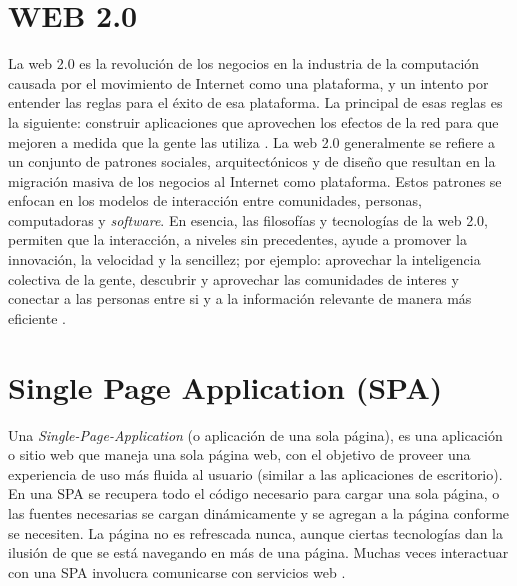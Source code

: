 \section{WEB 2.0} \label{sect:WEB 2.0}

La web 2.0 es la revolución de los negocios en la industria de la computación causada por el movimiento de Internet como una plataforma, y un intento por entender las reglas para el éxito de esa plataforma. La principal de esas reglas es la siguiente: construir aplicaciones que aprovechen los efectos de la red para que mejoren a medida que la gente las utiliza \cite{MTSAAS}.
La web 2.0 generalmente se refiere a un conjunto de patrones sociales, arquitectónicos y de diseño que resultan en la migración masiva de los negocios al Internet como plataforma. Estos patrones se enfocan en los modelos de interacción entre comunidades, personas, computadoras y \textit{software}. En esencia, las filosofías y tecnologías de la web 2.0, permiten que la interacción, a niveles sin precedentes, ayude a promover la innovación, la velocidad y la sencillez; por ejemplo: aprovechar la inteligencia colectiva de la gente, descubrir y aprovechar las comunidades de interes y conectar a las personas entre si y a la información relevante de manera más eficiente \cite{MTSAAS}.

\section{Single Page Application (SPA)} \label{sect:Single Page Application} 

Una \textit{Single-Page-Application} (o aplicación de una sola página), es una aplicación o sitio web que maneja una sola página web, con el objetivo de proveer una experiencia de uso más fluida al usuario (similar a las aplicaciones de escritorio).
En una SPA se recupera todo el código necesario para cargar una sola página, o las fuentes necesarias se cargan dinámicamente y se agregan a la página conforme se necesiten. La página no es refrescada nunca, aunque ciertas tecnologías dan la ilusión de que se está navegando en más de una página. Muchas veces interactuar con una SPA involucra comunicarse con servicios web \cite{MTSPA}.


